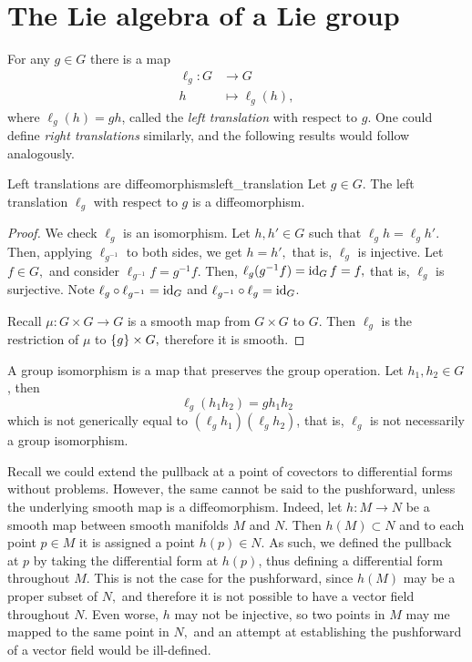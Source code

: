\section{The Lie algebra of a Lie group}
For any \(g \in G\) there is a map
\begin{align*}
    \ell_g : G &\to G\\
          h &\mapsto \ell_g(h),
\end{align*}
where \(\ell_g(h) = gh\), called the \emph{left translation} with respect to \(g\). One could define \emph{right translations} similarly, and the following results would follow analogously.

\begin{proposition}{Left translations are diffeomorphisms}{left_translation}
    Let \(g \in G\). The left translation \(\ell_g\) with respect to \(g\) is a diffeomorphism.
\end{proposition}
\begin{proof}
    We check \(\ell_g\) is an isomorphism. Let \(h, h' \in G\) such that \(\ell_gh = \ell_g h'\). Then, applying \(\ell_{g^{-1}}\) to both sides, we get \(h = h',\) that is, \(\ell_g\) is injective. Let \(f \in G,\) and consider \(\ell_{g^{-1}}f = g^{-1} f\). Then, \(\ell_g(g^{-1} f) = \operatorname{id}_{G}f = f,\) that is, \(\ell_{g}\) is surjective. Note \(\ell_g \circ \ell_{g^{-1}} = \operatorname{id}_{G}\) and \(\ell_{g^{-1}}\circ \ell_g = \operatorname{id}_{G}\).

    Recall \(\mu : G \times G \to G\) is a smooth map from \(G \times G\) to \(G\). Then \(\ell_g\) is the restriction of \(\mu\) to \(\{g\} \times G,\) therefore it is smooth.
\end{proof}

\begin{remark}
    A group isomorphism is a map that preserves the group operation. Let \(h_1, h_2 \in G\), then
    \begin{equation*}
        \ell_g (h_1h_2) = gh_1h_2
    \end{equation*}
    which is not generically equal to \(\left(\ell_gh_1\right)\left(\ell_gh_2\right)\), that is, \(\ell_g\) is not necessarily a group isomorphism.
\end{remark}

Recall we could extend the pullback at a point of covectors to differential forms without problems. However, the same cannot be said to the pushforward, unless the underlying smooth map is a diffeomorphism. Indeed, let \(h : M \to N\) be a smooth map between smooth manifolds \(M\) and \(N\). Then \(h(M) \subset N\) and to each point \(p \in M\) it is assigned a point \(h(p) \in N\). As such, we defined the pullback at \(p\) by taking the differential form at \(h(p)\), thus defining a differential form throughout \(M\). This is not the case for the pushforward, since \(h(M)\) may be a proper subset of \(N,\) and therefore it is not possible to have a vector field throughout \(N\). Even worse, \(h\) may not be injective, so two points in \(M\) may me mapped to the same point in \(N,\) and an attempt at establishing the pushforward of a vector field would be ill-defined.

